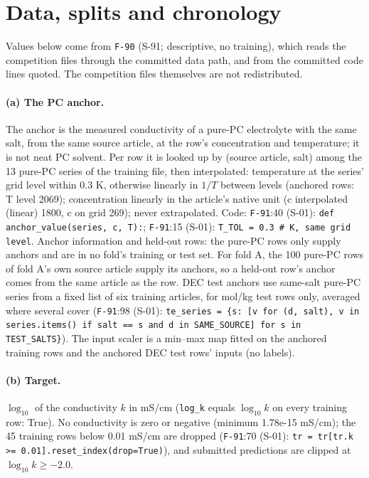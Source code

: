 \section{Data, splits and chronology}\label{app:data}

Values below come from \texttt{F-90} (S-91; descriptive, no training), which reads the competition files through the committed data path, and from the committed code lines quoted. The competition files themselves are not redistributed.

\paragraph{(a) The PC anchor.} The anchor is the measured conductivity of a pure-PC electrolyte with the same salt, from the same source article, at the row's concentration and temperature; it is not neat PC solvent. Per row it is looked up by (source article, salt) among the 13 pure-PC series of the training file, then interpolated: temperature at the series' grid level within 0.3 K, otherwise linearly in $1/T$ between levels (anchored rows: T level 2069); concentration linearly in the article's native unit (c interpolated (linear) 1800, c on grid 269); never extrapolated. Code: \texttt{F-91}:40 (S-01): \texttt{def anchor\_value(series, c, T):}; \texttt{F-91}:15 (S-01): \texttt{T\_TOL = 0.3  \# K, same grid level}. Anchor information and held-out rows: the pure-PC rows only supply anchors and are in no fold's training or test set. For fold A, the 100 pure-PC rows of fold A's own source article supply its anchors, so a held-out row's anchor comes from the same article as the row. DEC test anchors use same-salt pure-PC series from a fixed list of six training articles, for mol/kg test rows only, averaged where several cover (\texttt{F-91}:98 (S-01): \texttt{te\_series = \{s: [v for (d, salt), v in series.items() if salt == s and d in SAME\_SOURCE] for s in TEST\_SALTS\}}). The input scaler is a min--max map fitted on the anchored training rows and the anchored DEC test rows' inputs (no labels).

\paragraph{(b) Target.} $\log_{10}$ of the conductivity $k$ in mS/cm (\texttt{log\_k} equals $\log_{10} k$ on every training row: True). No conductivity is zero or negative (minimum 1.78e-15 mS/cm); the 45 training rows below 0.01 mS/cm are dropped (\texttt{F-91}:70 (S-01): \texttt{tr = tr[tr.k >= 0.01].reset\_index(drop=True)}), and submitted predictions are clipped at $\log_{10} k \geq -2.0$.

